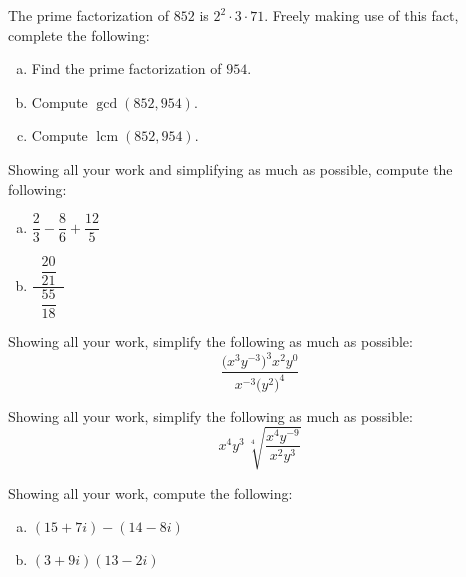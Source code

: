\documentclass[12pt,letterpaper]{exam}
\DeclareMathOperator{\lcm}{lcm}
\begin{document}
\examtitle
{} 
\scores
\bottomline
\newpage


\begin{questions}

\newpage
\question[10] The prime factorization of $852$ is $2^2 \cdot 3 \cdot 71$. Freely making use of this fact, complete the following:
	\begin{enumerate}[(a)]
	\item Find the prime factorization of $954$.
	\item Compute $\gcd(852, 954)$.
	\item Compute $\lcm(852, 954)$. 
	\end{enumerate}



\newpage
\question[10] Showing all your work and simplifying as much as possible, compute the following:
	\begin{enumerate}[(a)]
	\item $\dfrac{2}{3} - \dfrac{8}{6} + \dfrac{12}{5}$ \par\vspace{0.3cm}
	\item $\dfrac{\;\;\dfrac{20}{21}\;\;}{\;\;\dfrac{55}{18}\;\;}$
	\end{enumerate}



\newpage
\question[10] Showing all your work, simplify the following as much as possible: 
	\[
	\dfrac{\big( x^3 y^{-3} \big)^3 x^2 y^0}{x^{-3} \big( y^2 \big)^4}
	\]



\newpage
\question[10] Showing all your work, simplify the following as much as possible: 
	\[
	x^4 y^3 \, \sqrt[4]{\dfrac{x^4 y^{-9}}{x^2 y^3}}
	\]



\newpage
\question[10] Showing all your work, compute the following:
	\begin{enumerate}[(a)]
	\item $(15 + 7i) - (14 - 8i)$
	\item  $(3 + 9i)(13 - 2i)$
	\end{enumerate}




\end{questions}
\end{document}
